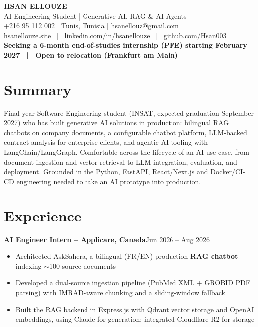 \documentclass[10pt,a4paper]{article}
\newcommand{\entry}[2]{\vspace{1pt}\noindent\textbf{#1}\hfill{\color{muted}#2}\par}
\begin{document}
\begin{center}
  {\LARGE\bfseries HSAN ELLOUZE}\\[2pt]
  {\color{muted} AI Engineering Student | Generative AI, RAG \& AI Agents}\\[2pt]
  {\footnotesize +216 95 112 002 | Tunis, Tunisia | hsanellouz@gmail.com}\\[1pt]
  {\footnotesize \href{https://hsanellouze.site}{hsanellouze.site} \ | \ \href{https://linkedin.com/in/hsanellouze}{linkedin.com/in/hsanellouze} \ | \ \href{https://github.com/Hsan003}{github.com/Hsan003}}\\[3pt]
  {\footnotesize\bfseries Seeking a 6-month end-of-studies internship (PFE) starting February 2027 \ | \ Open to relocation (Frankfurt am Main)}
\end{center}

\section{Summary}
Final-year Software Engineering student (INSAT, expected graduation September 2027) who has built generative AI solutions in production: bilingual RAG chatbots on company documents, a configurable chatbot platform, LLM-backed contract analysis for enterprise clients, and agentic AI tooling with LangChain/LangGraph. Comfortable across the lifecycle of an AI use case, from document ingestion and vector retrieval to LLM integration, evaluation, and deployment. Grounded in the Python, FastAPI, React/Next.js and Docker/CI-CD engineering needed to take an AI prototype into production.

\section{Experience}
\entry{AI Engineer Intern -- Applicare, Canada}{Jun 2026 -- Aug 2026}
\begin{itemize}
  \item Architected AskSahera, a bilingual (FR/EN) production \textbf{RAG chatbot} indexing $\sim$100 source documents
  \item Developed a dual-source ingestion pipeline (PubMed XML + GROBID PDF parsing) with IMRAD-aware chunking and a sliding-window fallback
  \item Built the RAG backend in Express.js with Qdrant vector storage and OpenAI embeddings, using Claude for generation; integrated Cloudflare R2 for storage
\end{itemize}
\end{document}
